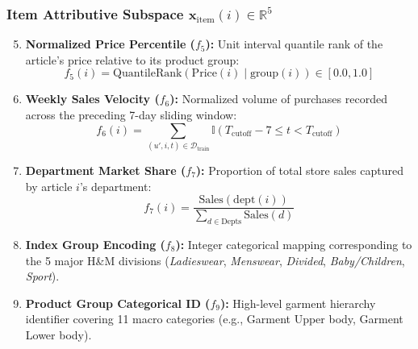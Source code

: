 \subsubsection{Item Attributive Subspace $\mathbf{x}_{\text{item}}(i) \in \mathbb{R}^5$}
\begin{enumerate}
    \setcounter{enumi}{4}
    \item \textbf{Normalized Price Percentile ($f_5$):} Unit interval quantile rank of the article's price relative to its product group:
    \begin{equation}
        f_5(i) = \text{QuantileRank}(\text{Price}(i) \mid \text{group}(i)) \in [0.0, 1.0]
    \end{equation}
    \item \textbf{Weekly Sales Velocity ($f_6$):} Normalized volume of purchases recorded across the preceding 7-day sliding window:
    \begin{equation}
        f_6(i) = \sum_{(u', i, t) \in \mathcal{D}_{\text{train}}} \mathbb{I}(T_{\text{cutoff}} - 7 \le t < T_{\text{cutoff}})
    \end{equation}
    \item \textbf{Department Market Share ($f_7$):} Proportion of total store sales captured by article $i$'s department:
    \begin{equation}
        f_7(i) = \frac{\text{Sales}(\text{dept}(i))}{\sum_{d \in \text{Depts}} \text{Sales}(d)}
    \end{equation}
    \item \textbf{Index Group Encoding ($f_8$):} Integer categorical mapping corresponding to the 5 major H\&M divisions (\textit{Ladieswear}, \textit{Menswear}, \textit{Divided}, \textit{Baby/Children}, \textit{Sport}).
    \item \textbf{Product Group Categorical ID ($f_9$):} High-level garment hierarchy identifier covering 11 macro categories (e.g., Garment Upper body, Garment Lower body).
\end{enumerate}

